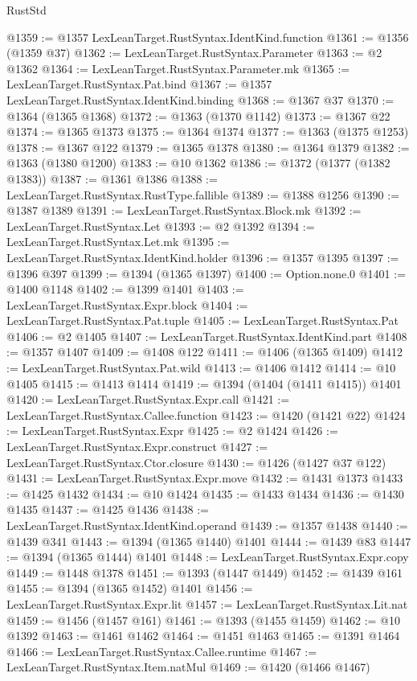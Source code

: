 \begin{lexlean}{RustStd}
\begin{coremodule}
@1359 := @1357 LexLeanTarget.RustSyntax.IdentKind.function
@1361 := @1356 (@1359 @37)
@1362 := LexLeanTarget.RustSyntax.Parameter
@1363 := @2 @1362
@1364 := LexLeanTarget.RustSyntax.Parameter.mk
@1365 := LexLeanTarget.RustSyntax.Pat.bind
@1367 := @1357 LexLeanTarget.RustSyntax.IdentKind.binding
@1368 := @1367 @37
@1370 := @1364 (@1365 @1368)
@1372 := @1363 (@1370 @1142)
@1373 := @1367 @22
@1374 := @1365 @1373
@1375 := @1364 @1374
@1377 := @1363 (@1375 @1253)
@1378 := @1367 @122
@1379 := @1365 @1378
@1380 := @1364 @1379
@1382 := @1363 (@1380 @1200)
@1383 := @10 @1362
@1386 := @1372 (@1377 (@1382 @1383))
@1387 := @1361 @1386
@1388 := LexLeanTarget.RustSyntax.RustType.fallible
@1389 := @1388 @1256
@1390 := @1387 @1389
@1391 := LexLeanTarget.RustSyntax.Block.mk
@1392 := LexLeanTarget.RustSyntax.Let
@1393 := @2 @1392
@1394 := LexLeanTarget.RustSyntax.Let.mk
@1395 := LexLeanTarget.RustSyntax.IdentKind.holder
@1396 := @1357 @1395
@1397 := @1396 @397
@1399 := @1394 (@1365 @1397)
@1400 := Option.none.{0}
@1401 := @1400 @1148
@1402 := @1399 @1401
@1403 := LexLeanTarget.RustSyntax.Expr.block
@1404 := LexLeanTarget.RustSyntax.Pat.tuple
@1405 := LexLeanTarget.RustSyntax.Pat
@1406 := @2 @1405
@1407 := LexLeanTarget.RustSyntax.IdentKind.part
@1408 := @1357 @1407
@1409 := @1408 @122
@1411 := @1406 (@1365 @1409)
@1412 := LexLeanTarget.RustSyntax.Pat.wild
@1413 := @1406 @1412
@1414 := @10 @1405
@1415 := @1413 @1414
@1419 := @1394 (@1404 (@1411 @1415)) @1401
@1420 := LexLeanTarget.RustSyntax.Expr.call
@1421 := LexLeanTarget.RustSyntax.Callee.function
@1423 := @1420 (@1421 @22)
@1424 := LexLeanTarget.RustSyntax.Expr
@1425 := @2 @1424
@1426 := LexLeanTarget.RustSyntax.Expr.construct
@1427 := LexLeanTarget.RustSyntax.Ctor.closure
@1430 := @1426 (@1427 @37 @122)
@1431 := LexLeanTarget.RustSyntax.Expr.move
@1432 := @1431 @1373
@1433 := @1425 @1432
@1434 := @10 @1424
@1435 := @1433 @1434
@1436 := @1430 @1435
@1437 := @1425 @1436
@1438 := LexLeanTarget.RustSyntax.IdentKind.operand
@1439 := @1357 @1438
@1440 := @1439 @341
@1443 := @1394 (@1365 @1440) @1401
@1444 := @1439 @83
@1447 := @1394 (@1365 @1444) @1401
@1448 := LexLeanTarget.RustSyntax.Expr.copy
@1449 := @1448 @1378
@1451 := @1393 (@1447 @1449)
@1452 := @1439 @161
@1455 := @1394 (@1365 @1452) @1401
@1456 := LexLeanTarget.RustSyntax.Expr.lit
@1457 := LexLeanTarget.RustSyntax.Lit.nat
@1459 := @1456 (@1457 @161)
@1461 := @1393 (@1455 @1459)
@1462 := @10 @1392
@1463 := @1461 @1462
@1464 := @1451 @1463
@1465 := @1391 @1464
@1466 := LexLeanTarget.RustSyntax.Callee.runtime
@1467 := LexLeanTarget.RustSyntax.Item.natMul
@1469 := @1420 (@1466 @1467)

\end{coremodule}
\end{lexlean}
